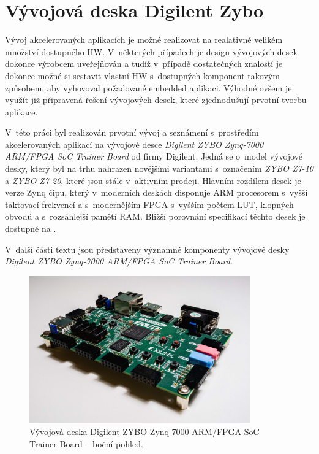 \documentclass[a4paper, twoside, 11pt]{article}
\begin{document}
	

	\section{Vývojová deska Digilent Zybo}\label{sec:vyvojova-deska-digilent-zybo}
			Vývoj akcelerovaných aplikacích je možné realizovat na realativně velikém množství dostupného HW. V~některých případech je design vývojových desek dokonce výrobcem uveřejňován a tudíž v~případě dostatečných znalostí je dokonce možné si sestavit vlastní HW s~dostupných komponent takovým způsobem, aby vyhovoval požadované embedded aplikaci. Výhodné ovšem je využít již připravená řešení vývojových desek, které zjednodušují prvotní tvorbu aplikace.\par
			V~této práci byl realizován prvotní vývoj a seznámení s~prostředím akcelerovaných aplikací na vývojové desce \textit{Digilent ZYBO Zynq-7000 ARM/FPGA SoC Trainer Board} od firmy Digilent. \cite{digilent-zybo-7000-docs} Jedná se o~model vývojové desky, který byl na trhu nahrazen novějšími variantami s~označením \textit{ZYBO Z7-10} a \textit{ZYBO Z7-20}, které jsou stále v~aktivním prodeji. Hlavním rozdílem desek je verze Zynq čipu, který v~moderních deskách disponuje ARM procesorem s~vyšší taktovací frekvencí a s~modernějším FPGA s~vyšším počtem LUT, klopných obvodů a s~rozsáhlejší pamětí RAM. Bližší porovnání specifikací těchto desek je dostupné na \cite{digilent-zybo-compare}.\par
			V~další části textu jsou představeny významné komponenty vývojové desky \textit{Digilent ZYBO Zynq-7000 ARM/FPGA SoC Trainer Board}.

			\begin{figure}[htbp!]
				\centering
					\includegraphics[width=0.85\textwidth]{src/jpg/digilent-zybo-foto-2.jpeg} 
					\caption{Vývojová deska Digilent ZYBO Zynq-7000 ARM/FPGA SoC Trainer Board – boční pohled.}
					\label{fig:digilent-zybo-foto-2}
			\end{figure}
\end{document}
